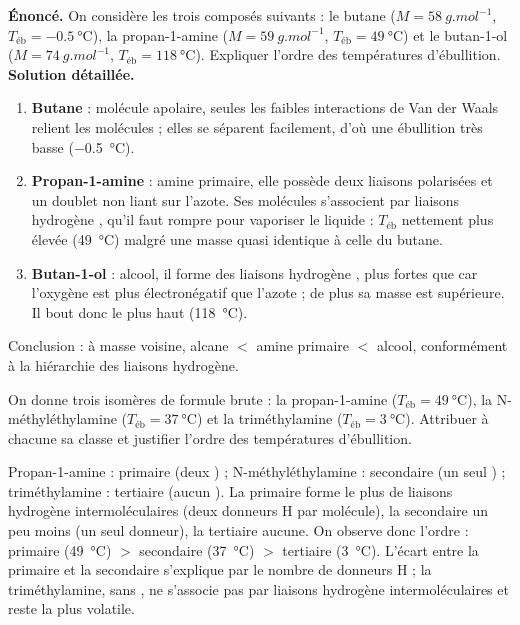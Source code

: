 \documentclass[11pt]{article}
\begin{document}
\begin{exoresolu}
\textbf{Énoncé.} On considère les trois composés suivants : le butane  ($M = \SI{58}{g.mol^{-1}}$, $T_{\text{éb}} = \SI{-0,5}{\celsius}$), la propan-1-amine  ($M = \SI{59}{g.mol^{-1}}$, $T_{\text{éb}} = \SI{49}{\celsius}$) et le butan-1-ol  ($M = \SI{74}{g.mol^{-1}}$, $T_{\text{éb}} = \SI{118}{\celsius}$). Expliquer l'ordre des températures d'ébullition.
\tcblower
\textbf{Solution détaillée.}
\begin{enumerate}
\item \textbf{Butane} : molécule apolaire, seules les faibles interactions de Van der Waals relient les molécules ; elles se séparent facilement, d'où une ébullition très basse (\SI{-0,5}{\celsius}).
\item \textbf{Propan-1-amine} : amine primaire, elle possède deux liaisons  polarisées et un doublet non liant sur l'azote. Ses molécules s'associent par liaisons hydrogène , qu'il faut rompre pour vaporiser le liquide : $T_{\text{éb}}$ nettement plus élevée (\SI{49}{\celsius}) malgré une masse quasi identique à celle du butane.
\item \textbf{Butan-1-ol} : alcool, il forme des liaisons hydrogène , plus fortes que  car l'oxygène est plus électronégatif que l'azote ; de plus sa masse est supérieure. Il bout donc le plus haut (\SI{118}{\celsius}).
\end{enumerate}
Conclusion : à masse voisine, alcane $<$ amine primaire $<$ alcool, conformément à la hiérarchie des liaisons hydrogène.
\end{exoresolu}

\begin{exercice}
On donne trois isomères de formule brute  : la propan-1-amine  ($T_{\text{éb}} = \SI{49}{\celsius}$), la N-méthyléthylamine  ($T_{\text{éb}} = \SI{37}{\celsius}$) et la triméthylamine  ($T_{\text{éb}} = \SI{3}{\celsius}$). Attribuer à chacune sa classe et justifier l'ordre des températures d'ébullition.
\end{exercice}

\begin{corrige}[Exercice 1]
Propan-1-amine : primaire (deux ) ; N-méthyléthylamine : secondaire (un seul ) ; triméthylamine : tertiaire (aucun ). La primaire forme le plus de liaisons hydrogène intermoléculaires (deux donneurs H par molécule), la secondaire un peu moins (un seul donneur), la tertiaire aucune. On observe donc l'ordre : primaire (\SI{49}{\celsius}) $>$ secondaire (\SI{37}{\celsius}) $>$ tertiaire (\SI{3}{\celsius}). L'écart entre la primaire et la secondaire s'explique par le nombre de donneurs H ; la triméthylamine, sans , ne s'associe pas par liaisons hydrogène intermoléculaires et reste la plus volatile.
\end{corrige}
\end{document}
